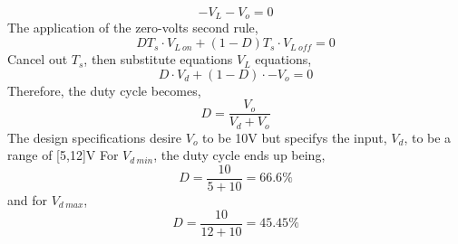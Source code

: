 \documentclass[12pt,twoside]{scrartcl}
\begin{document}
    \begin{equation}
        -V_L - V_o = 0
    \end{equation}
    The application of the zero-volts second rule,
    \begin{equation}
        DT_s \cdot V_{L \: on} + (1-D)T_s \cdot V_{L\:off} = 0
    \end{equation}
    Cancel out $T_s$, then substitute equations $V_L$ equations,
    \begin{equation}
        D \cdot V_d+ (1-D) \cdot -V_o = 0
    \end{equation}
    Therefore, the duty cycle becomes,
    \begin{equation}
        D  = \dfrac{V_o}{V_d+V_o}
    \end{equation}
    The design specifications desire $V_o$ to be 10V but specifys the input, $V_d$, to be a range of [5,12]V
    For $V_{d\:min}$, the duty cycle ends up being,
    \begin{equation}
        D = \dfrac{10}{5+10} = 66.6\%
    \end{equation}
    and for $V_{d\:max}$,
    \begin{equation}
        D = \dfrac{10}{12+10} = 45.45\%
    \end{equation}
\end{document}
